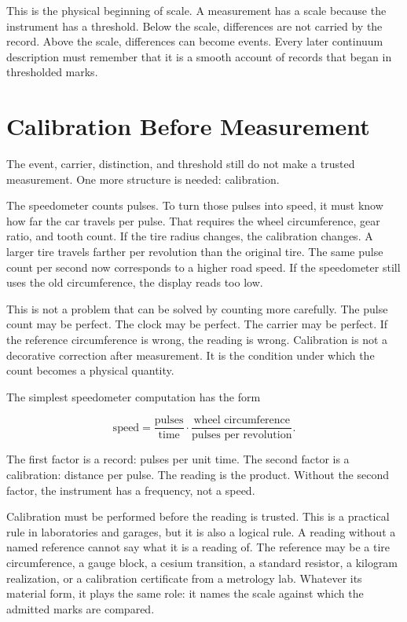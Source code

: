 This is the physical beginning of scale. A measurement has a scale because the
instrument has a threshold. Below the scale, differences are not carried by the
record. Above the scale, differences can become events. Every later continuum
description must remember that it is a smooth account of records that began in
thresholded marks.

\section{Calibration Before Measurement}
\label{se:calibration-before-measurement}

The event, carrier, distinction, and threshold still do not make a trusted
measurement. One more structure is needed: calibration.

The speedometer counts pulses. To turn those pulses into speed, it must know how
far the car travels per pulse. That requires the wheel circumference, gear
ratio, and tooth count. If the tire radius changes, the calibration changes. A
larger tire travels farther per revolution than the original tire. The same
pulse count per second now corresponds to a higher road speed. If the
speedometer still uses the old circumference, the display reads too low.

This is not a problem that can be solved by counting more carefully. The pulse
count may be perfect. The clock may be perfect. The carrier may be perfect. If
the reference circumference is wrong, the reading is wrong. Calibration is not a
decorative correction after measurement. It is the condition under which the
count becomes a physical quantity.

The simplest speedometer computation has the form

\[
\text{speed}
  =
  \frac{\text{pulses}}{\text{time}}
  \cdot
  \frac{\text{wheel circumference}}{\text{pulses per revolution}}.
\]

The first factor is a record: pulses per unit time. The second factor is a
calibration: distance per pulse. The reading is the product. Without the second
factor, the instrument has a frequency, not a speed.

Calibration must be performed before the reading is trusted. This is a
practical rule in laboratories and garages, but it is also a logical rule. A
reading without a named reference cannot say what it is a reading of. The
reference may be a tire circumference, a gauge block, a cesium transition, a
standard resistor, a kilogram realization, or a calibration certificate from a
metrology lab. Whatever its material form, it plays the same role: it names the
scale against which the admitted marks are compared.

